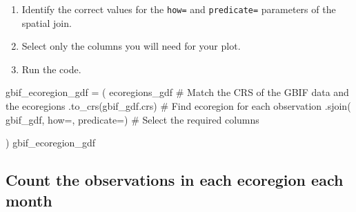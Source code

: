 \documentclass[
  letterpaper,
  DIV=11,
  numbers=noendperiod,
  oneside]{scrreprt}
\newenvironment{Shaded}{\begin{snugshade}}{\end{snugshade}}
\newcommand{\CommentTok}[1]{\textcolor[rgb]{0.37,0.37,0.37}{#1}}
\newcommand{\NormalTok}[1]{\textcolor[rgb]{0.00,0.23,0.31}{#1}}
\newcommand{\OperatorTok}[1]{\textcolor[rgb]{0.37,0.37,0.37}{#1}}
\newcommand{\StringTok}[1]{\textcolor[rgb]{0.13,0.47,0.30}{#1}}
\providecommand{\tightlist}{%
  \setlength{\itemsep}{0pt}\setlength{\parskip}{0pt}}
\begin{document}
\begin{tcolorbox}[enhanced jigsaw, colbacktitle=quarto-callout-color!10!white, opacityback=0, bottomtitle=1mm, toptitle=1mm, bottomrule=.15mm, left=2mm, colframe=quarto-callout-color-frame, leftrule=.75mm, opacitybacktitle=0.6, colback=white, rightrule=.15mm, toprule=.15mm, breakable, titlerule=0mm, title=\textcolor{quarto-callout-color}{\faInfo}\hspace{0.5em}{Try It: Perform a spatial join}, coltitle=black, arc=.35mm]

\begin{enumerate}
\def\labelenumi{\arabic{enumi}.}
\tightlist
\item
  Identify the correct values for the \texttt{how=} and
  \texttt{predicate=} parameters of the spatial join.
\item
  Select only the columns you will need for your plot.
\item
  Run the code.
\end{enumerate}

\end{tcolorbox}

\begin{Shaded}
\begin{Highlighting}[]
\NormalTok{gbif\_ecoregion\_gdf }\OperatorTok{=}\NormalTok{ (}
\NormalTok{    ecoregions\_gdf}
    \CommentTok{\# Match the CRS of the GBIF data and the ecoregions}
\NormalTok{    .to\_crs(gbif\_gdf.crs)}
    \CommentTok{\# Find ecoregion for each observation}
\NormalTok{    .sjoin(}
\NormalTok{        gbif\_gdf,}
\NormalTok{        how}\OperatorTok{=}\StringTok{\textquotesingle{}\textquotesingle{}}\NormalTok{, }
\NormalTok{        predicate}\OperatorTok{=}\StringTok{\textquotesingle{}\textquotesingle{}}\NormalTok{)}
    \CommentTok{\# Select the required columns}
    
\NormalTok{)}
\NormalTok{gbif\_ecoregion\_gdf}
\end{Highlighting}
\end{Shaded}

\subsection{Count the observations in each ecoregion each
month}\label{count-the-observations-in-each-ecoregion-each-month}
\end{document}
